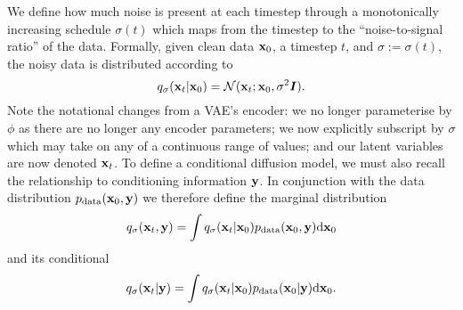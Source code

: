 We define how much noise is present at each timestep through a monotonically increasing schedule $\sigma(t)$ which maps from the timestep to the ``noise-to-signal ratio'' of the data. Formally, given clean data ${\mathbf{x}}_0$, a timestep $t$, and $\sigma := \sigma(t)$, the noisy data is distributed according to
\begin{equation}
    q_\sigma({\mathbf{x}}_t|{\mathbf{x}}_0) = {\mathcal{N}} ( {\mathbf{x}}_t ; {\mathbf{x}}_0, \sigma^2 {\bm{I}} ).
\end{equation}
Note the notational changes from a VAE's encoder: we no longer parameterise by $\phi$ as there are no longer any encoder parameters; we now explicitly subscript by $\sigma$ which may take on any of a continuous range of values; and our latent variables are now denoted ${\mathbf{x}}_t$. To define a conditional diffusion model, we must also recall the relationship to conditioning information ${\mathbf{y}}$. In conjunction with the data distribution $p_{\rm{data}}({\mathbf{x}}_0, {\mathbf{y}})$ we therefore define the marginal distribution
\begin{equation}
    q_\sigma({\mathbf{x}}_t,{\mathbf{y}}) = \int q_\sigma({\mathbf{x}}_t|{\mathbf{x}}_0) p_{\rm{data}}({\mathbf{x}}_0, {\mathbf{y}}) \mathrm{d} {\mathbf{x}}_0
\end{equation}
and its conditional
\begin{equation}
    q_\sigma({\mathbf{x}}_t|{\mathbf{y}}) = \int q_\sigma({\mathbf{x}}_t|{\mathbf{x}}_0) p_{\rm{data}}({\mathbf{x}}_0|{\mathbf{y}}) \mathrm{d} {\mathbf{x}}_0.
\end{equation}



